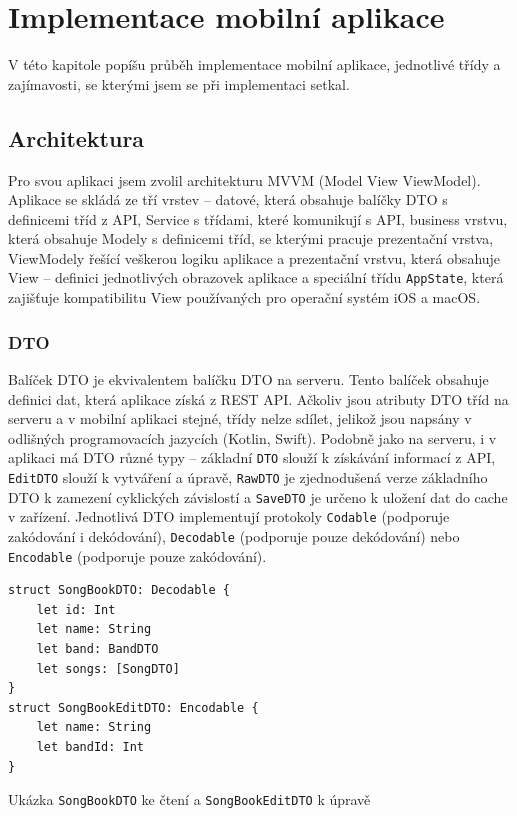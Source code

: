 \chapter{Implementace mobilní aplikace}

\begin{chapterabstract}
    V této kapitole popíšu průběh implementace mobilní aplikace, jednotlivé třídy a zajímavosti, se kterými jsem se při implementaci setkal.
\end{chapterabstract}

\section{Architektura}

Pro svou aplikaci jsem zvolil architekturu MVVM (Model View ViewModel). Aplikace se skládá ze tří vrstev -- datové, která obsahuje balíčky DTO s definicemi tříd z API, Service s třídami, které komunikují s API, business vrstvu, která obsahuje Modely s definicemi tříd, se kterými pracuje prezentační vrstva, ViewModely řešící veškerou logiku aplikace a prezentační vrstvu, která obsahuje View -- definici jednotlivých obrazovek aplikace a speciální třídu \texttt{AppState}, která zajišťuje kompatibilitu View používaných pro operační systém iOS a macOS.

\subsection{DTO}

Balíček DTO je ekvivalentem balíčku DTO na serveru. Tento balíček obsahuje definici dat, která aplikace získá z REST API. Ačkoliv jsou atributy DTO tříd na serveru a v mobilní aplikaci stejné, třídy nelze sdílet, jelikož jsou napsány v odlišných programovacích jazycích (Kotlin, Swift). Podobně jako na serveru, i v aplikaci má DTO různé typy -- základní \texttt{DTO} slouží k získávání informací z API, \texttt{EditDTO} slouží k vytváření a úpravě, \texttt{RawDTO} je zjednodušená verze základního DTO k zamezení cyklických závislostí a \texttt{SaveDTO} je určeno k uložení dat do cache v zařízení. Jednotlivá DTO implementují protokoly \texttt{Codable} \cite{swift-codable} (podporuje zakódování i dekódování), \texttt{Decodable} (podporuje pouze dekódování) nebo \texttt{Encodable} (podporuje pouze zakódování).

\begin{listing}[H]
\begin{verbatim}
struct SongBookDTO: Decodable {
    let id: Int
    let name: String
    let band: BandDTO
    let songs: [SongDTO]
}
struct SongBookEditDTO: Encodable {
    let name: String
    let bandId: Int
}
\end{verbatim}
\caption[Ukázka DTO zpěvníku v aplikaci]{Ukázka \texttt{SongBookDTO} ke čtení a \texttt{SongBookEditDTO} k úpravě}
\end{listing}

